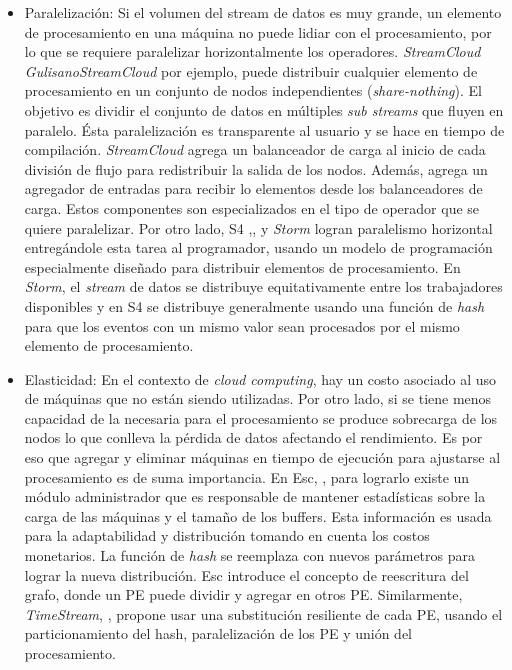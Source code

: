 \begin{itemize}
\item Paralelización: Si el volumen del stream de datos es muy grande, un elemento de procesamiento en una máquina no puede lidiar con el procesamiento, por lo que se requiere paralelizar horizontalmente los operadores. \textit{StreamCloud} \textit{GulisanoStreamCloud} por ejemplo, puede distribuir cualquier elemento de procesamiento en un conjunto de nodos independientes (\textit{share-nothing}). El objetivo es dividir el conjunto de datos en múltiples \textit{sub streams} que fluyen en paralelo. Ésta paralelización es transparente al usuario y se hace en tiempo de compilación. \textit{StreamCloud} agrega un balanceador de carga al inicio de cada división de flujo para redistribuir la salida de los nodos. Además, agrega un agregador de entradas para recibir lo elementos desde los balanceadores de carga. Estos componentes son especializados en el tipo de operador que se quiere paralelizar. Por otro lado, S4 ,\cite{NeumeyerS4}, y \textit{Storm} logran paralelismo horizontal entregándole esta tarea al programador, usando un modelo de programación especialmente diseñado para distribuir elementos de procesamiento. En \textit{Storm}, el \textit{stream} de datos se distribuye equitativamente entre los trabajadores disponibles y en S4 se distribuye generalmente usando una función de \textit{hash} para que los eventos con un mismo valor sean procesados por el mismo elemento de procesamiento.
\item Elasticidad: En el contexto de \textit{cloud computing}, hay un costo asociado al uso de máquinas que no están siendo utilizadas. Por otro lado, si se tiene menos capacidad de la necesaria para el procesamiento se produce sobrecarga de los nodos lo que conlleva la pérdida de datos afectando el rendimiento. Es por eso que agregar y eliminar máquinas en tiempo de ejecución para ajustarse al procesamiento es de suma importancia. En Esc, \cite{SatzgerESC}, para lograrlo existe un módulo administrador que es responsable de mantener estadísticas sobre la carga de las máquinas y el tamaño de los buffers. Esta información es usada para la adaptabilidad y distribución tomando en cuenta los costos monetarios. La función de \textit{hash} se reemplaza con nuevos parámetros para lograr la nueva distribución. Esc introduce el concepto de reescritura del grafo, donde un PE puede dividir y agregar en otros PE.
Similarmente, \textit{TimeStream}, \cite{QianTimeStream}, propone usar una substitución resiliente de cada PE, usando el particionamiento del hash, paralelización de los PE y unión del procesamiento.

\end{itemize}
